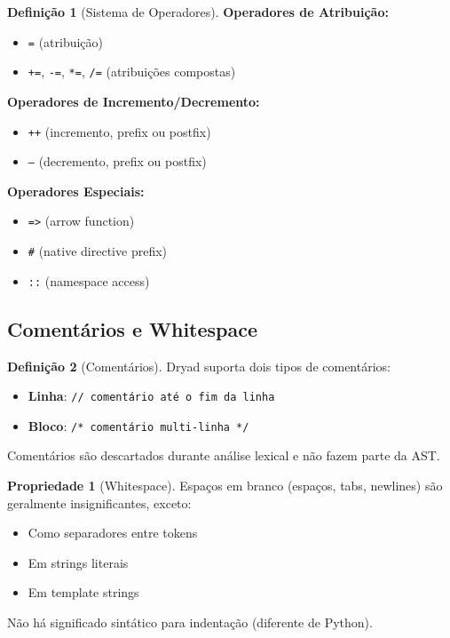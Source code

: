 \documentclass[12pt,a4paper]{article}
\theoremstyle{definition}
\newtheorem{definition}{Definição}[section]
\newtheorem{property}{Propriedade}[section]
\begin{document}
\begin{definition}[Sistema de Operadores]
\textbf{Operadores de Atribuição:}
\begin{itemize}[noitemsep]
    \item \texttt{=} (atribuição)
    \item \texttt{+=}, \texttt{-=}, \texttt{*=}, \texttt{/=} (atribuições compostas)
\end{itemize}

\textbf{Operadores de Incremento/Decremento:}
\begin{itemize}[noitemsep]
    \item \texttt{++} (incremento, prefix ou postfix)
    \item \texttt{--} (decremento, prefix ou postfix)
\end{itemize}

\textbf{Operadores Especiais:}
\begin{itemize}[noitemsep]
    \item \texttt{=>} (arrow function)
    \item \texttt{\#} (native directive prefix)
    \item \texttt{::} (namespace access)
\end{itemize}
\end{definition}

\subsection{Comentários e Whitespace}

\begin{definition}[Comentários]
Dryad suporta dois tipos de comentários:
\begin{itemize}
    \item \textbf{Linha}: \texttt{// comentário até o fim da linha}
    \item \textbf{Bloco}: \texttt{/* comentário multi-linha */}
\end{itemize}
Comentários são descartados durante análise lexical e não fazem parte da AST.
\end{definition}

\begin{property}[Whitespace]
Espaços em branco (espaços, tabs, newlines) são geralmente insignificantes, exceto:
\begin{itemize}
    \item Como separadores entre tokens
    \item Em strings literais
    \item Em template strings
\end{itemize}
Não há significado sintático para indentação (diferente de Python).
\end{property}
\end{document}
